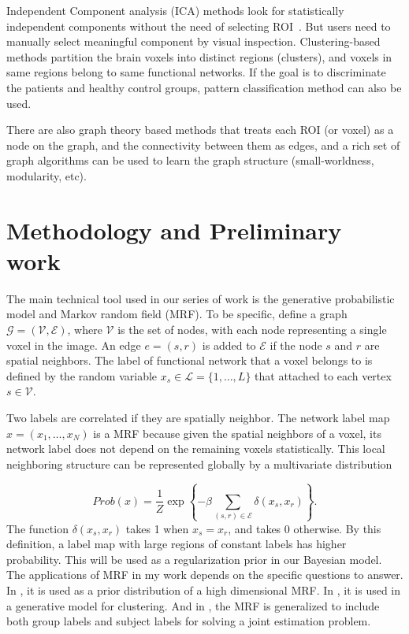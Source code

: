 \documentclass[12pt]{article}
\begin{document}
Independent Component analysis (ICA) methods look for statistically independent
components without the need of selecting ROI~\cite{calhoun2001spatial}. But
users need to manually select meaningful component by visual
inspection. Clustering-based methods partition the brain voxels into distinct
regions (clusters), and voxels in same regions belong to same functional
networks. If the goal is to discriminate the patients and healthy control
groups, pattern classification method can also be used.

There are also graph theory based methods that treats each ROI (or voxel) as a
node on the graph, and the connectivity between them as edges, and a rich set of
graph algorithms can be used to learn the graph structure (small-worldness,
modularity, etc). 


\section{Methodology and Preliminary work} 
The main technical tool used in our series of work is the generative
probabilistic model and Markov random field (MRF). To be specific, define a graph
$\mathcal{G} = (\mathcal{V}, \mathcal{E})$, where $\mathcal{V}$ is the set of
nodes, with each node representing a single voxel in the image.  An edge
$e=(s,r)$ is added to $\mathcal{E}$ if the node $s$ and $r$ are spatial
neighbors. The label of functional network that a voxel belongs to is defined by
the random variable $x_s \in \mathcal{L} = \{1,\dots, L\}$ that attached to each
vertex $s\in \mathcal{V}$.

Two labels are correlated if they are spatially neighbor. The network label map
$x = (x_1, \dots, x_N)$ is a MRF because given the spatial neighbors of a voxel,
its network label does not depend on the remaining voxels statistically. This
local neighboring structure can be represented globally by a multivariate
distribution

\begin{equation*}
  Prob(x) = \frac{1}{Z}\exp\left\{-\beta \sum_{(s, r)\in\mathcal{E}} \delta(x_s, x_r)\right\}.
\end{equation*}
The function $\delta(x_s,x_r)$ takes 1 when $x_s = x_r$, and takes 0
otherwise. By this definition, a label map with large regions of constant labels
has higher probability. This will be used as a regularization prior in our
Bayesian model. The applications of MRF in my work depends on the specific
questions to answer. In \cite{liu2010spatialCopy}, it is used as a prior
distribution of a high dimensional MRF. In \cite{liu2011monteCopy}, it is used in a
generative model for clustering. And in \cite{Liu2012aCopy}, the MRF is
generalized to include both group labels and subject labels for solving a joint
estimation problem.
\end{document}
